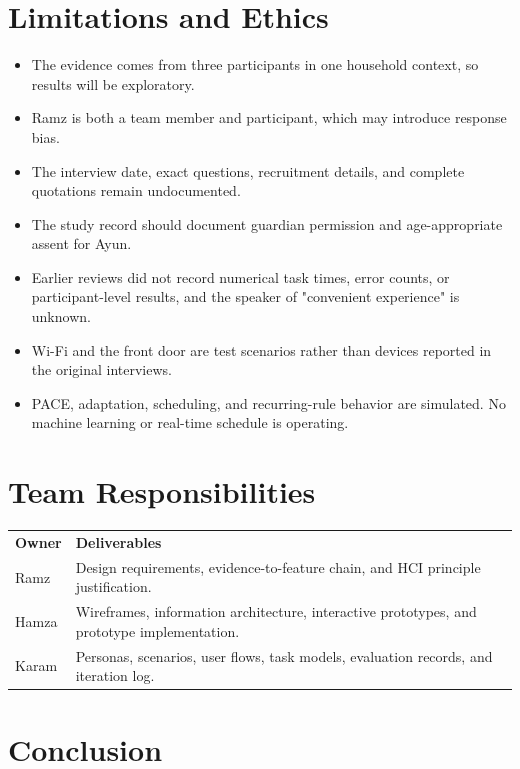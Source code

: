\documentclass[11pt,letterpaper]{article}
\newcommand{\thead}[1]{\cellcolor{SharedNavy}\color{white}\bfseries #1}
\begin{document}
\section{Limitations and Ethics}

\begin{itemize}
  \item The evidence comes from three participants in one household context, so results will be exploratory.
  \item Ramz is both a team member and participant, which may introduce response bias.
  \item The interview date, exact questions, recruitment details, and complete quotations remain undocumented.
  \item The study record should document guardian permission and age-appropriate assent for Ayun.
  \item Earlier reviews did not record numerical task times, error counts, or participant-level results, and the speaker of "convenient experience" is unknown.
  \item Wi-Fi and the front door are test scenarios rather than devices reported in the original interviews.
  \item PACE, adaptation, scheduling, and recurring-rule behavior are simulated. No machine learning or real-time schedule is operating.
\end{itemize}

\section{Team Responsibilities}

\begin{tabularx}{\textwidth}{P{1.2in} Y}
  \thead{Owner} & \thead{Deliverables}\\
  Ramz & Design requirements, evidence-to-feature chain, and HCI principle justification.\\
  Hamza & Wireframes, information architecture, interactive prototypes, and prototype implementation.\\
  Karam & Personas, scenarios, user flows, task models, evaluation records, and iteration log.\\
\end{tabularx}

\section{Conclusion}
\end{document}
